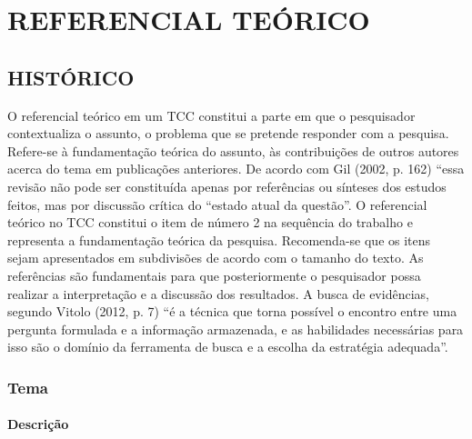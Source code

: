 \chapter{REFERENCIAL TEÓRICO}
\label{fundamentacao}

\section{HISTÓRICO}
O referencial teórico em um TCC constitui a parte em que o pesquisador contextualiza o assunto, o problema que se pretende responder com a pesquisa. Refere-se à fundamentação teórica do assunto, às contribuições de outros autores acerca do tema em publicações anteriores.
De acordo com Gil (2002, p. 162) “essa revisão não pode ser constituída apenas por referências ou sínteses dos estudos feitos, mas por discussão crítica do “estado atual da questão”.
O referencial teórico no TCC constitui o item de número 2 na sequência do trabalho e representa a fundamentação teórica da pesquisa. Recomenda-se que os itens sejam apresentados em subdivisões de acordo com o tamanho do texto. As referências são fundamentais para que posteriormente o pesquisador possa realizar a interpretação e a discussão dos resultados.
A busca de evidências, segundo Vitolo (2012, p. 7) “é a técnica que torna possível o encontro entre uma pergunta formulada e a informação armazenada, e as habilidades necessárias para isso são o domínio da ferramenta de busca e a escolha da estratégia adequada”.
\subsection{Tema}

\subsubsection{Descrição}


